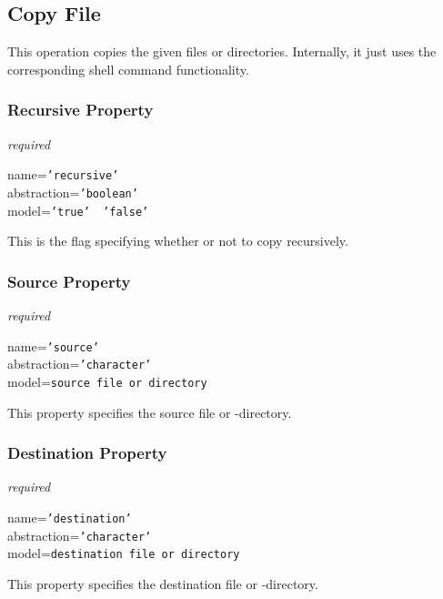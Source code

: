 %
%
%
%
%
%

\subsection{Copy File}
\label{copy_file_heading}

This operation copies the given files or directories. Internally, it just uses
the corresponding shell command functionality.

\subsubsection{Recursive Property}

\emph{required}

name=\texttt{'recursive'}\\
abstraction=\texttt{'boolean'}\\
model=\texttt{'true' \vline\ 'false'}

This is the flag specifying whether or not to copy recursively.

\subsubsection{Source Property}

\emph{required}

name=\texttt{'source'}\\
abstraction=\texttt{'character'}\\
model=\texttt{source file or directory}

This property specifies the source file or -directory.

\subsubsection{Destination Property}

\emph{required}

name=\texttt{'destination'}\\
abstraction=\texttt{'character'}\\
model=\texttt{destination file or directory}

This property specifies the destination file or -directory.
